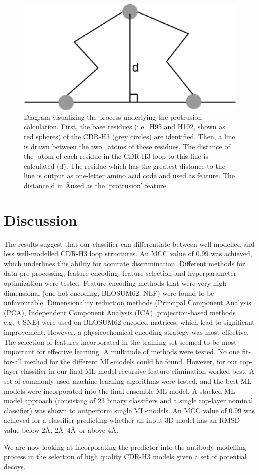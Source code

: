 \begin{figure}
  \centering
  \includegraphics[scale=0.5]{protrusion.eps}
  \caption {Diagram
    visualizing the process underlying the protrusion
    calculation. First, the base residues (i.e.\ H95 and H102, shown as
    red spheres) of the CDR-H3 (grey circles) are identified. Then, a
    line is drawn between the two \ca\ atoms of these residues.
    The distance of the \ca-atom of each residue in the
    CDR-H3 loop to this line is calculated (d). The residue which has the
    greatest distance to the line is output
    as one-letter amino acid code and used as feature. The distance d in
    \AA\is used as the `protrusion'
    feature.}
  \label{fig:angle}
\end{figure}




\section{Discussion}
The results suggest that our classifier can differentiate
between well-modelled and less well-modelled CDR-H3 loop
structures. An MCC value of 0.99 was achieved, which underlines this
ability for accurate discrimination. Different methods for data
pre-processing, feature encoding, feature selection and hyperparameter
optimization were tested.
Feature encoding methods that were very high-dimensional
(one-hot-encoding, BLOSUM62, NLF) were found to be
unfavourable. Dimensionality reduction methods (Principal Component
Analysis (PCA), Independent Component Analysis (ICA), projection-based
methods e.g.\ t-SNE) were used on BLOSUM62 encoded matrices, which lead
to significant improvement. However, a physicochemical encoding
strategy was most effective.
The selection of features incorporated in the training set seemed to
be most important for effective learning. A multitude of methods were
tested. No one fit-for-all method for the different ML-models could be
found. However, for our top-layer classifier in our final ML-model
recursive feature elimination worked best.
A set of commonly used machine learning algorithms were tested, and
the best ML-models were incorporated into the final ensemble ML-model. A
stacked ML-model approach (consisting of 23 binary classifiers and a
single top-layer nominal classifier) was shown to outperform single
ML-models.
An MCC value of 0.99 was achieved for a classifier predicting whether
an input 3D-model has an RMSD value below 2\AA, 2\AA--4\AA\ or above
4\AA.

We are now looking at incorporating the predictor into the antibody
modelling process in the selection of high quality CDR-H3 models given
a set of potential decoys.

  
  
  
